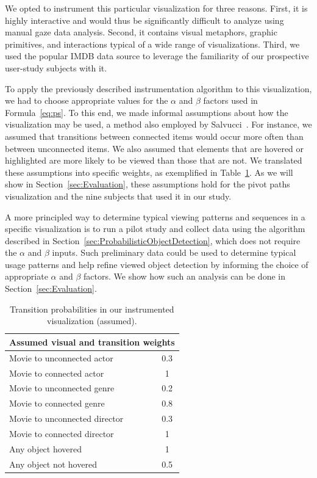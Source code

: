 We opted to instrument this particular visualization for three reasons. First, it is highly interactive and would thus be significantly difficult to analyze using manual gaze data analysis. Second, it contains visual metaphors, graphic primitives, and interactions typical of a wide range of visualizations. Third, we used the popular IMDB data source to leverage the familiarity of our prospective user-study subjects with it.  

To apply the previously described instrumentation algorithm to this visualization, we had to choose appropriate values for the $\alpha$ and $\beta$ factors used in Formula~\ref{eq:ps}. To this end, we made informal assumptions about how the visualization may be used, a method also employed by Salvucci~\cite{salvucci2000intelligent}. For instance, we assumed that transitions between connected items would occur more often than between unconnected items. We also assumed that elements that are hovered or highlighted are more likely to be viewed than those that are not. We translated these assumptions into specific weights, as exemplified in Table~\ref{tab:Transition2}. As we will show in Section~\ref{sec:Evaluation}, these assumptions hold for the pivot paths visualization and the nine subjects that used it in our study.

A more principled way to determine typical viewing patterns and sequences in a specific visualization is to run a pilot study and collect data using the algorithm described in Section~\ref{sec:ProbabilisticObjectDetection}, which does not require the $\alpha$ and $\beta$ inputs. Such preliminary data could be used to determine typical usage patterns and help refine viewed object detection by informing the choice of appropriate $\alpha$ and $\beta$ factors. We show how such an analysis can be done in Section~\ref{sec:Evaluation}. 

\begin{table}[htbp]
	\centering
		\begin{tabular}{|l|c|}
			\hline
			 \multicolumn{2}{|c|}{Assumed visual and transition weights} \\ \hline
			Movie to unconnected actor & 0.3\\\hline
			Movie to connected actor & 1\\\hline
			Movie to unconnected genre & 0.2\\\hline
			Movie to connected genre & 0.8\\\hline
			Movie to unconnected director & 0.3\\\hline
			Movie to connected director & 1\\\hline
			Any object hovered & 1\\\hline
			Any object not hovered & 0.5\\
			\hline			
		\end{tabular}
	\caption{Transition probabilities in our instrumented visualization (assumed).}
	\label{tab:Transition2}
\end{table}


